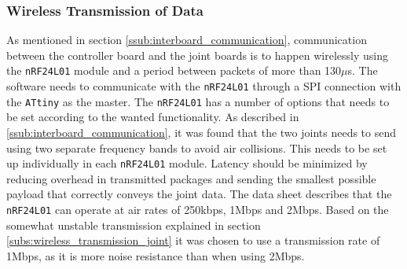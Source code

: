 \subsubsection{Wireless Transmission of Data}
As mentioned in section \ref{ssub:interboard_communication}, communication between the controller board and the joint boards is to happen wirelessly using the \texttt{nRF24L01} module and a period between packets of more than 130$\mu$s.
The software needs to communicate with the \texttt{nRF24L01} through a SPI connection with the \texttt{ATtiny} as the master.
The \texttt{nRF24L01} has a number of options that needs to be set according to the wanted functionality.
As described in \ref{ssub:interboard_communication}, it was found that the two joints needs to send using two separate frequency bands to avoid air collisions. 
This needs to be set up individually in each \texttt{nRF24L01} module. 
Latency should be minimized by reducing overhead in transmitted packages and sending the smallest possible payload that correctly conveys the joint data.
The data sheet describes that the \texttt{nRF24L01} can operate at air rates of 250kbps, 1Mbps and 2Mbps.
Based on the somewhat unstable transmission explained in section \ref{subs:wireless_transmission_joint} it was chosen to use a transmission rate of 1Mbps, as it is more noise resistance than when using 2Mbps.


